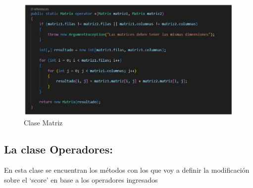 \documentclass[a4paper,12pt]{article}
\begin{document}
    \begin{figure}[h]
    	\centering
    	\includegraphics[width=14cm]{matrix.png}
    	\caption{Clase Matriz}
    \end{figure}
    
    
    \subsection{La clase Operadores:}
    
    En esta clase se encuentran los métodos con los que voy a definir la modificación sobre el ‘score’ en base a los operadores ingresados
    
\end{document}

